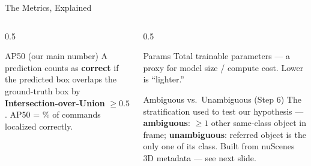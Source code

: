 \documentclass[aspectratio=169]{beamer}
\begin{document}
\begin{frame}{The Metrics, Explained}
  \begin{columns}[T]
    \begin{column}{0.5\textwidth}
      \begin{block}{AP50 (our main number)}
        \small A prediction counts as \textbf{correct} if the
        predicted box overlaps the ground-truth box by
        \textbf{Intersection-over-Union} $\geq 0.5$. AP50 = \% of
        commands localized correctly.
      \end{block}
      \begin{center}
      \end{center}
    \end{column}
    \begin{column}{0.5\textwidth}
      \begin{block}{Params}
        \footnotesize Total trainable parameters — a proxy for model
        size / compute cost. Lower is ``lighter.''
      \end{block}
      \begin{block}{Ambiguous vs.\ Unambiguous (Step 6)}
        \footnotesize The stratification used to test our hypothesis
        — \textbf{ambiguous}: $\geq 1$ other same-class object in
        frame; \textbf{unambiguous}: referred object is the only one
        of its class. Built from nuScenes 3D metadata — see next
        slide.
      \end{block}
    \end{column}
  \end{columns}
\end{frame}
\end{document}
